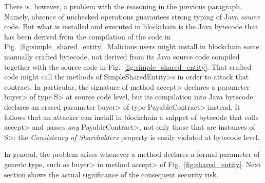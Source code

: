 There is, however, a problem with the reasoning
in the previous paragraph. Namely, absence of unchecked
operations guarantees strong typing of Java \emph{source} code. But what is installed
and executed in blockchain is the Java bytecode that has been derived from
the compilation of the code in Fig.~\ref{fig:simple_shared_entity}.
Malicious users might install in blockchain some manually crafted bytecode,
not derived from its Java source code compiled together with the source code
in Fig.~\ref{fig:simple_shared_entity}.
That crafted code might
call the methods of \<SimpleSharedEntity>s in order to attack
that contract. In particular,
the signature of method \<accept> declares a parameter \<buyer> of type \<S> at source code level, but
its compilation into Java bytecode declares an erased
parameter \<buyer> of type \<PayableContract> instead.
It follows that an attacker can install in blockchain a snippet of bytecode that calls
\<accept> and passes \emph{any} \<PayableContract>, not only those that are instances of \<S>:
the \emph{Consistency of Shareholders} property is easily violated at bytecode level.

In general, the problem arises whenever a method declares a formal parameter of generic type,
such as \<buyer> in method \<accept> of Fig.~\ref{fig:shared_entity}. Next section shows
the actual significance of the consequent security risk.
